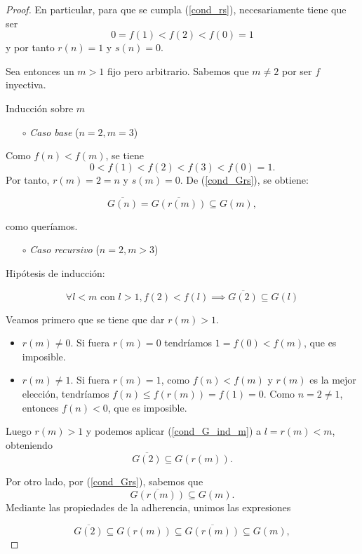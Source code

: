 \documentclass{article}
\newcommand{\pref}[1]{(\ref{#1})}
\begin{document}
\begin{proof}
En particular, para que se cumpla \pref{cond_rs}, necesariamente tiene que ser $$0 = f(1) < f(2) < f(0) = 1$$ y por tanto $r(n) = 1$ y $s(n) = 0.$

Sea entonces un $m > 1$ fijo pero arbitrario. Sabemos que $m \neq 2$ por ser $f$ inyectiva.

Inducción sobre $m$

\begin{itemize}
  \setlength{\itemindent}{2em}
  \item[$\circ$] \textit{Caso base} ($n = 2, m= 3$)
\end{itemize}

Como $f(n) < f(m)$, se tiene $$0 < f(1) < f(2) < f(3) < f(0) = 1.$$ Por tanto, $r(m) = 2 = n$ y $s(m) = 0$. De \pref{cond_Grs}, se obtiene:

$$
\overline{G(n)} = \overline{G(r(m))} \subseteq G(m),
$$

como queríamos.

\begin{itemize}
  \setlength{\itemindent}{2em}
  \item[$\circ$] \textit{Caso recursivo} ($n = 2, m>3$)
\end{itemize}

Hipótesis de inducción:

\begin{equation} \label{cond_G_ind_m}
  \forall l < m \text{ con } l > 1, f(2) < f(l) \implies \overline{G(2)} \subseteq G(l)
\end{equation}

Veamos primero que se tiene que dar $r(m) > 1$.

\begin{itemize}
  \item $r(m) \neq 0$. Si fuera $r(m) = 0$ tendríamos $1 = f(0) < f(m)$, que es imposible.
  \item $r(m) \neq 1$. Si fuera $r(m) = 1$, como $f(n) < f(m)$ y $r(m)$ es la mejor elección, tendríamos $f(n) \leq f(r(m)) = f(1) = 0$. Como $n=2\neq 1$, entonces $f(n) < 0$, que es imposible.
\end{itemize}


Luego $r(m)> 1$ y podemos aplicar \pref{cond_G_ind_m} a $l=r(m)<m$, obteniendo $$\overline{G(2)} \subseteq G(r(m)).$$

Por otro lado, por \pref{cond_Grs}, sabemos que $$\overline{G(r(m))} \subseteq G(m).$$ Mediante las propiedades de la adherencia, unimos las expresiones

$$
\overline{G(2)} \subseteq G(r(m)) \subseteq \overline{G(r(m))} \subseteq G(m),
$$


\end{proof}
\end{document}
